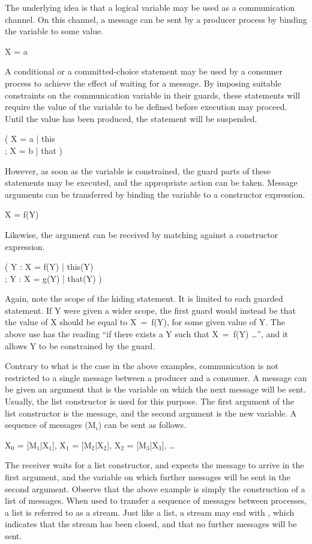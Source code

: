 The underlying idea is that a logical variable may be used as a
communication channel.  On this channel, a message can be sent by a
producer process by binding the variable to some value.
%
\begin{progex}
X = a
\end{progex}%
%
A conditional or a committed-choice statement may be used by a
consumer process to achieve the effect of waiting for a message.  By
imposing suitable constraints on the communication variable in their
guards, these statements will require the value of the variable to be
defined before execution may proceed.  Until the value has been
produced, the statement will be suspended.
%
\begin{progex}
( X = a | this \\
; X = b | that )
\end{progex}%
%
However, as soon as the variable is constrained, the guard parts of
these statements may be executed, and the appropriate action can be
taken.  Message arguments can be transferred by binding the variable
to a constructor expression.
%
\begin{progex}
X = f(Y)
\end{progex}%
%
Likewise, the argument can be received by matching against a
constructor expression.
%
\begin{progex}
( Y : X = f(Y) | this(Y) \\
; Y : X = g(Y) | that(Y) )
\end{progex}%
%
Again, note the scope of the hiding statement.  It is limited to each
guarded statement.  If {\prog Y} were given a wider scope, the first
guard would instead be that the value of {\prog X} should be equal to
{\prog X~=~f(Y)}, for some given value of {\prog Y}.  The above use
has the reading ``if there exists a {\prog Y} such that {\prog
X~=~f(Y)} \dots'', and it allows {\prog Y} to be constrained by the
guard.

Contrary to what is the case in the above examples, communication is
not restricted to a single message between a producer and a
consumer.  A message can be given an argument that is the variable on
which the next message will be sent.  Usually, the list constructor is
used for this purpose.  The first argument of the list constructor is
the message, and the second argument is the new variable.  A sequence
of messages ({\prog M$_i$}) can be sent as follows.
%
\begin{progex}
X$_0$ = [M$_1$|X$_1$], X$_1$ = [M$_2$|X$_2$], X$_2$ = [M$_3$|X$_3$], \dots
\end{progex}%
%
The receiver waits for a list constructor, and expects the message to
arrive in the first argument, and the variable on which further
messages will be sent in the second argument.  Observe that the above
example is simply the construction of a list of messages.  When used
to transfer a sequence of messages between processes, a list is
referred to as a stream.  Just like a list, a stream may end with
{\prog []}, which indicates that the stream has been closed, and that
no further messages will be sent.

